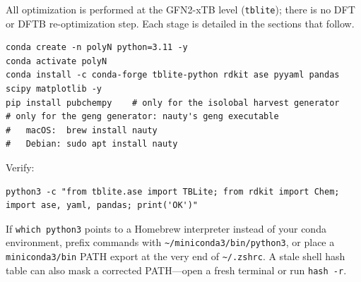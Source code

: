 \documentclass[11pt,a4paper]{article}
\begin{document}
\begin{center}
\end{center}

All optimization is performed at the GFN2-xTB level (\texttt{tblite}); there
is no DFT or DFTB re-optimization step. Each stage is detailed in the
sections that follow.



\begin{lstlisting}
conda create -n polyN python=3.11 -y
conda activate polyN
conda install -c conda-forge tblite-python rdkit ase pyyaml pandas scipy matplotlib -y
pip install pubchempy    # only for the isolobal harvest generator
# only for the geng generator: nauty's geng executable
#   macOS:  brew install nauty
#   Debian: sudo apt install nauty
\end{lstlisting}

Verify:
\begin{lstlisting}
python3 -c "from tblite.ase import TBLite; from rdkit import Chem; import ase, yaml, pandas; print('OK')"
\end{lstlisting}

\begin{remark}
If \texttt{which python3} points to a Homebrew interpreter instead of your
conda environment, prefix commands with \texttt{\textasciitilde/miniconda3/bin/python3},
or place a \texttt{miniconda3/bin} PATH export at the very end of
\texttt{\textasciitilde/.zshrc}. A stale shell hash table can also mask a
corrected PATH---open a fresh terminal or run \texttt{hash -r}.
\end{remark}
\end{document}
